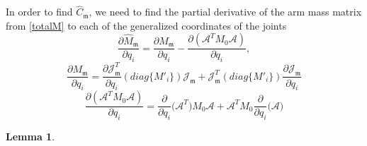 \documentclass[lettersize,journal]{IEEEtran}
\def \A {\mathcal{A}}
\newtheorem{lemma}{Lemma}
\theoremstyle{remark}
\begin{document}
In order to find $\hat{C}_\mathfrak{m}$, we need to find the partial derivative of the arm mass matrix from \eqref{totalM} to each of the generalized coordinates of the joints
\begin{equation}
    \frac{\partial\hat{M}_{\mathfrak{m}}}{\partial q_i}=\frac{\partial{M}_{\mathfrak{m}}}{\partial q_i}-\frac{\partial{(\A^TM_0\A)}}{\partial q_i},
\end{equation}
\begin{equation}
 \frac{\partial M_\mathfrak{m}}{\partial q_i}
=
\frac{\partial{\mathcal{J}}_\mathfrak{m}^T}{\partial q_i} (diag\{M'_i\}){\mathcal{J}}_\mathfrak{m}+{\mathcal{J}}_\mathfrak{m}^T(diag\{M'_i\})\frac{\partial {\mathcal{J}}_\mathfrak{m}}{\partial q_i} %
\end{equation}
\begin{equation}
    \frac{\partial (\A^TM_0\A)}{\partial q_i}={\frac{\partial}{\partial q_i}(\A^T})M_0\A+ \A^TM_0{\frac{\partial}{\partial q_i}(\A})
\end{equation}
\begin{lemma}

\end{lemma}
\end{document}
